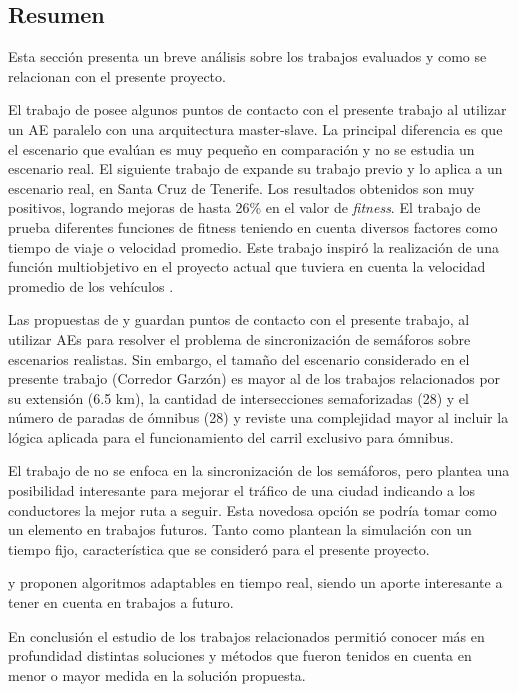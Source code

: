 \subsection{Resumen}
Esta sección presenta un breve análisis sobre los trabajos evaluados y como se relacionan con el presente proyecto.

El trabajo de \citet{Sanchez2004} posee algunos puntos de contacto con el presente trabajo al utilizar un AE paralelo con una arquitectura master-slave. La principal diferencia es que el escenario que evalúan es muy pequeño en comparación y no se estudia un escenario real.
El siguiente trabajo de \citet{Sanchez2008} expande su trabajo previo y lo aplica a un escenario real, en Santa Cruz de Tenerife. Los resultados obtenidos son muy positivos, logrando mejoras de hasta 26\% en el valor de \emph{fitness}. 
El trabajo de \citep{Sanchez2010} prueba diferentes funciones de fitness teniendo en cuenta diversos factores como tiempo de viaje o velocidad promedio. Este trabajo inspiró la realización de una función multiobjetivo en el proyecto actual que tuviera en cuenta la velocidad promedio de los vehículos .

Las propuestas de \citet{Sanchez2008} y \citet{Rouphail2000} guardan puntos de contacto con el presente trabajo, al utilizar AEs para resolver el problema de sincronización de semáforos sobre escenarios realistas. Sin embargo, el tamaño del escenario considerado en el presente trabajo (Corredor Garzón) es mayor al de los trabajos relacionados por su extensión (6.5 km), la cantidad de intersecciones semaforizadas (28) y el número de paradas de ómnibus (28) y reviste una complejidad mayor al incluir la lógica aplicada para el funcionamiento del carril exclusivo para ómnibus.

El trabajo de \citet{Stolfi2012} no se enfoca en la sincronización de los semáforos, pero plantea una posibilidad interesante para mejorar el tráfico de una ciudad indicando a los conductores la mejor ruta a seguir. Esta novedosa opción se podría tomar como un elemento en trabajos futuros. Tanto \citet{Teo2010} como \citet{Stolfi2012} plantean la simulación con un tiempo fijo, característica que se consideró para el presente proyecto.

\citet{Montana1996} y \citet{Vogel2000}  proponen algoritmos adaptables en tiempo real, siendo un aporte interesante a tener en cuenta en trabajos a futuro.

En conclusión el estudio de los trabajos relacionados permitió conocer más en profundidad distintas soluciones y métodos que fueron tenidos en cuenta en menor o mayor medida en la solución propuesta.

